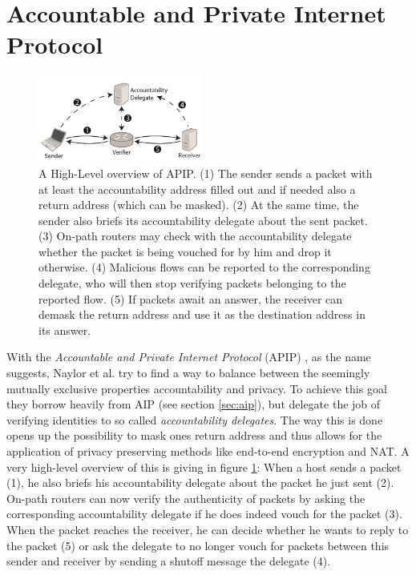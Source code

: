 \documentclass{acm_proc_article-sp}
\begin{document}

\section{Accountable and Private Internet Protocol}
\label{sec:apip}
\begin{figure}[t]
  \includegraphics[width=0.48\textwidth]{images/apipoverview.PNG}
  \caption{A High-Level overview of APIP. (1) The sender sends a packet with at least the accountability address filled out and if needed also a return address (which can be masked). (2) At the same time, the sender also briefs its accountability delegate about the sent packet. (3) On-path routers may check with the accountability delegate whether the packet is being vouched for by him and drop it otherwise. (4) Malicious flows can be reported to the corresponding delegate, who will then stop verifying packets belonging to the reported flow. (5) If packets await an answer, the receiver can demask the return address and use it as the destination address in its answer. \cite{apip}}
  \label{fig:apipoverview}
\end{figure}
With the \emph{Accountable and Private Internet Protocol} (APIP) \cite{apip}, as the name suggests, Naylor et al. try to find a way to balance between the seemingly mutually exclusive properties accountability and privacy. To achieve this goal they borrow heavily from AIP (see section \ref{sec:aip}), but delegate the job of verifying identities to so called \emph{accountability delegates}. The way this is done opens up the possibility to mask ones return address and thus allows for the application of privacy preserving methods like end-to-end encryption and NAT. A very high-level overview of this is giving in figure \ref{fig:apipoverview}: When a host sends a packet (1), he also briefs his accountability delegate about the packet he just sent (2). On-path routers can now verify the authenticity of packets by asking the corresponding accountability delegate if he does indeed vouch for the packet (3). When the packet reaches the receiver, he can decide whether he wants to reply to the packet (5) or ask the delegate to no longer vouch for packets between this sender and receiver by sending a shutoff message the delegate (4).
\end{document}
